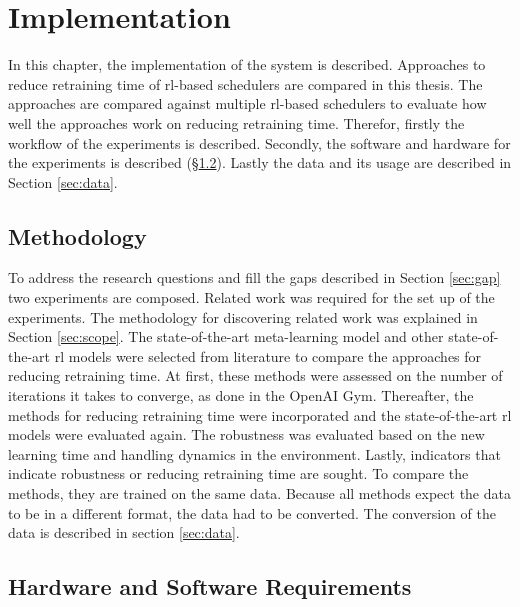 \chapter{Implementation}\label{sec:method}

In this chapter, the implementation of the system is described. Approaches to
reduce retraining time of \gls{rl}-based schedulers are compared in this
thesis. The approaches are compared against multiple \gls{rl}-based schedulers
to evaluate how well the approaches work on reducing retraining time.
Therefor, firstly the workflow of the experiments is described. Secondly, the
software and hardware for the experiments is described (§\ref{sec:setup}).
Lastly the data and its usage are described in Section \ref{sec:data}.

\section{Methodology}

To address the research questions and fill the gaps described in Section
\ref{sec:gap} two experiments are composed. Related work was required for the
set up of the experiments. The methodology for discovering related work was
explained in Section \ref{sec:scope}. The state-of-the-art meta-learning model
and other state-of-the-art \gls{rl} models were selected from literature to
compare the approaches for reducing retraining time. At first, these methods were
assessed on the number of iterations it takes to converge, as done in the
OpenAI Gym. Thereafter, the methods for reducing retraining time were
incorporated and the state-of-the-art \gls{rl} models were evaluated again.
The robustness was evaluated based on the new learning time and handling
dynamics in the environment. Lastly, indicators that indicate robustness or
reducing retraining time are sought. To compare the methods, they are trained
on the same data. Because all methods expect the data to be in a different
format, the data had to be converted. The conversion of the data is described
in section \ref{sec:data}.


\section{Hardware and Software Requirements}\label{sec:setup}

